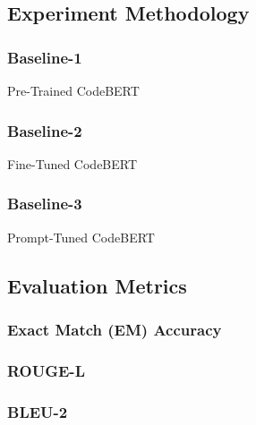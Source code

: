 \subsection{Experiment Methodology}
\subsubsection{Baseline-1} Pre-Trained CodeBERT
\subsubsection{Baseline-2} Fine-Tuned CodeBERT
\subsubsection{Baseline-3} Prompt-Tuned CodeBERT

\subsection{Evaluation Metrics}
\subsubsection{Exact Match (EM) Accuracy}
\subsubsection{ROUGE-L}
\subsubsection{BLEU-2}


